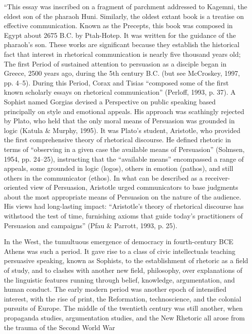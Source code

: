 \documentclass{article} %
\begin{document}
“This essay was inscribed on a fragment of parchment addressed to Kagemni, the eldest son of the pharaoh Huni. Similarly, the oldest extant book is a treatise on effective communication. Known as the Precepts, this book was composed in Egypt about 2675 B.C. by Ptah-Hotep. It was written for the guidance of the pharaoh’s son. These works are significant because they establish the historical fact that interest in rhetorical communication is nearly five thousand years old;
The first Period of sustained attention to persuasion as a disciple began in Greece, 2500 years ago, during the 5th century B.C. (but see McCroskey, 1997, pp. 4–5). During this Period, Corax and Tisias “composed some of the first known scholarly essays on rhetorical communication” (Perloff, 1993, p. 37). A Sophist named Gorgias devised a Perspective on public speaking based principally on style and emotional appeals. His approach was scathingly rejected by Plato, who held that the only moral means of Persuasion was grounded in logic (Katula & Murphy, 1995). It was Plato's student, Aristotle, who provided the first comprehensive theory of rhetorical discourse. He defined rhetoric in terms of “observing in a given case the available means of Persuasion” (Solmsen, 1954, pp. 24–25), instructing that the “available means” encompassed a range of appeals, some grounded in logic (logos), others in emotion (pathos), and still others in the communicator (ethos). In what can be described as a receiver-oriented view of Persuasion, Aristotle urged communicators to base judgments about the most appropriate means of Persuasion on the nature of the audience. His views had long-lasting impact: “Aristotle's theory of rhetorical discourse has withstood the test of time, furnishing axioms that guide today's practitioners of Persuasion and campaigns” (Pfau & Parrott, 1993, p. 25).


In the West, the tumultuous emergence of democracy in fourth-century BCE Athens was such a period. It gave rise to a class of civic intellectuals teaching persuasive speaking, known as Sophists, to the establishment of rhetoric as a field of study, and to clashes with another new field, philosophy, over explanations of the linguistic features running through belief, knowledge, argumentation, and human conduct. The early modern period was another epoch of intensified interest, with the rise of print, the Reformation, technoscience, and the colonial pursuits of Europe. The middle of the twentieth century was still another, when propaganda studies, argumentation studies, and the New Rhetoric all arose from the trauma of the Second World War
\end{document}
